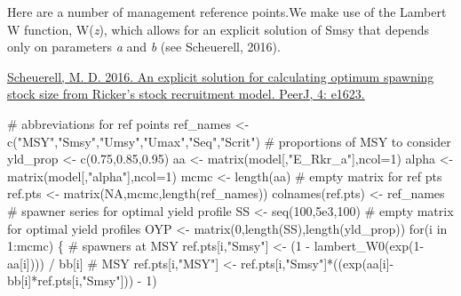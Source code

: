 \documentclass[
  11pt,
]{article}
\newenvironment{Shaded}{}{}
\newcommand{\CommentTok}[1]{\textcolor[rgb]{0.00,0.50,0.00}{#1}}
\newcommand{\ControlFlowTok}[1]{\textcolor[rgb]{0.00,0.00,1.00}{#1}}
\newcommand{\DataTypeTok}[1]{#1}
\newcommand{\DecValTok}[1]{#1}
\newcommand{\FloatTok}[1]{#1}
\newcommand{\KeywordTok}[1]{\textcolor[rgb]{0.00,0.00,1.00}{#1}}
\newcommand{\NormalTok}[1]{#1}
\newcommand{\OperatorTok}[1]{#1}
\newcommand{\OtherTok}[1]{\textcolor[rgb]{1.00,0.25,0.00}{#1}}
\newcommand{\StringTok}[1]{\textcolor[rgb]{0.00,0.50,0.50}{#1}}
\begin{document}
Here are a number of management reference points.We make use of the
Lambert W function, W(\emph{z}), which allows for an explicit solution
of Smsy that depends only on parameters \emph{a} and \emph{b} (see
Scheuerell, 2016).

\href{https://peerj.com/articles/1623/}{Scheuerell, M. D. 2016. An
explicit solution for calculating optimum spawning stock size from
Ricker's stock recruitment model. PeerJ, 4: e1623.}

\begin{Shaded}
\begin{Highlighting}[]
\CommentTok{# abbreviations for ref points}
\NormalTok{ref_names <-}\StringTok{ }\KeywordTok{c}\NormalTok{(}\StringTok{"MSY"}\NormalTok{,}\StringTok{"Smsy"}\NormalTok{,}\StringTok{"Umsy"}\NormalTok{,}\StringTok{"Umax"}\NormalTok{,}\StringTok{"Seq"}\NormalTok{,}\StringTok{"Scrit"}\NormalTok{)}
\CommentTok{# proportions of MSY to consider}
\NormalTok{yld_prop <-}\StringTok{ }\KeywordTok{c}\NormalTok{(}\FloatTok{0.75}\NormalTok{,}\FloatTok{0.85}\NormalTok{,}\FloatTok{0.95}\NormalTok{)}
\NormalTok{aa <-}\StringTok{ }\KeywordTok{matrix}\NormalTok{(model[,}\StringTok{"E_Rkr_a"}\NormalTok{],}\DataTypeTok{ncol=}\DecValTok{1}\NormalTok{)}
\NormalTok{alpha <-}\StringTok{ }\KeywordTok{matrix}\NormalTok{(model[,}\StringTok{"alpha"}\NormalTok{],}\DataTypeTok{ncol=}\DecValTok{1}\NormalTok{)}
\NormalTok{mcmc <-}\StringTok{ }\KeywordTok{length}\NormalTok{(aa)}
\CommentTok{# empty matrix for ref pts}
\NormalTok{ref.pts <-}\StringTok{ }\KeywordTok{matrix}\NormalTok{(}\OtherTok{NA}\NormalTok{,mcmc,}\KeywordTok{length}\NormalTok{(ref_names))}
\KeywordTok{colnames}\NormalTok{(ref.pts) <-}\StringTok{ }\NormalTok{ref_names}
\CommentTok{# spawner series for optimal yield profile}
\NormalTok{SS <-}\StringTok{ }\KeywordTok{seq}\NormalTok{(}\DecValTok{100}\NormalTok{,}\FloatTok{5e3}\NormalTok{,}\DecValTok{100}\NormalTok{)}
\CommentTok{# empty matrix for optimal yield profiles}
\NormalTok{OYP <-}\StringTok{ }\KeywordTok{matrix}\NormalTok{(}\DecValTok{0}\NormalTok{,}\KeywordTok{length}\NormalTok{(SS),}\KeywordTok{length}\NormalTok{(yld_prop))}
\ControlFlowTok{for}\NormalTok{(i }\ControlFlowTok{in} \DecValTok{1}\OperatorTok{:}\NormalTok{mcmc) \{}
  \CommentTok{# spawners at MSY}
\NormalTok{  ref.pts[i,}\StringTok{"Smsy"}\NormalTok{] <-}\StringTok{ }\NormalTok{(}\DecValTok{1} \OperatorTok{-}\StringTok{ }\KeywordTok{lambert_W0}\NormalTok{(}\KeywordTok{exp}\NormalTok{(}\DecValTok{1}\OperatorTok{-}\NormalTok{aa[i]))) }\OperatorTok{/}\StringTok{ }\NormalTok{bb[i]}
  \CommentTok{# MSY}
\NormalTok{  ref.pts[i,}\StringTok{"MSY"}\NormalTok{] <-}\StringTok{ }\NormalTok{ref.pts[i,}\StringTok{"Smsy"}\NormalTok{]}\OperatorTok{*}\NormalTok{((}\KeywordTok{exp}\NormalTok{(aa[i]}\OperatorTok{-}\NormalTok{bb[i]}\OperatorTok{*}\NormalTok{ref.pts[i,}\StringTok{"Smsy"}\NormalTok{])) }\OperatorTok{-}\StringTok{ }\DecValTok{1}\NormalTok{)}

\end{Highlighting}
\end{Shaded}
\end{document}
